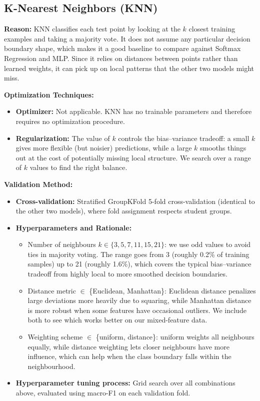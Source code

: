 \documentclass[12pt]{article}
\begin{document}
\begin{itemize}
    \end{itemize}

\subsection{K-Nearest Neighbors (KNN)}

\textbf{Reason:} KNN classifies each test point by looking at the $k$ closest training examples and taking a majority vote. It does not assume any particular decision boundary shape, which makes it a good baseline to compare against Softmax Regression and MLP. Since it relies on distances between points rather than learned weights, it can pick up on local patterns that the other two models might miss.

\textbf{Optimization Techniques:}
    \begin{itemize}
        \item \textbf{Optimizer:} Not applicable. KNN has no trainable parameters and therefore requires no optimization procedure. 
        \item \textbf{Regularization:} The value of $k$ controls the bias--variance tradeoff: a small $k$ gives more flexible (but noisier) predictions, while a large $k$ smooths things out at the cost of potentially missing local structure. We search over a range of $k$ values to find the right balance.
    \end{itemize}
\textbf{Validation Method:}
        \begin{itemize}
        \item \textbf{Cross-validation:} Stratified GroupKFold 5-fold cross-validation (identical to the other two models), where fold assignment respects student groups.
        \item \textbf{Hyperparameters and Rationale:}
            \begin{itemize}
                \item Number of neighbours $k \in \{3, 5, 7, 11, 15, 21\}$: we use odd values to avoid ties in majority voting. The range goes from 3 (roughly 0.2\% of training samples) up to 21 (roughly 1.6\%), which covers the typical bias--variance tradeoff from highly local to more smoothed decision boundaries.
                \item Distance metric $\in$ \{Euclidean, Manhattan\}: Euclidean distance penalizes large deviations more heavily due to squaring, while Manhattan distance is more robust when some features have occasional outliers. We include both to see which works better on our mixed-feature data.
                \item Weighting scheme $\in$ \{uniform, distance\}: uniform weights all neighbours equally, while distance weighting lets closer neighbours have more influence, which can help when the class boundary falls within the neighbourhood.
            \end{itemize}
        \item \textbf{Hyperparameter tuning process:} Grid search over all combinations above, evaluated using macro-F1 on each validation fold.

    \end{itemize}
\end{document}

